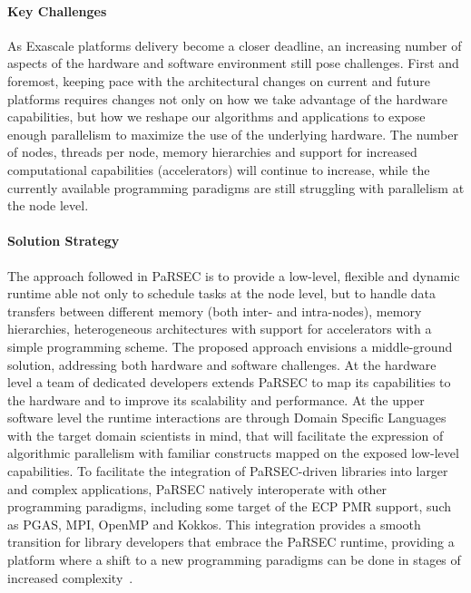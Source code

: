 \paragraph{Key Challenges}

As Exascale platforms delivery become a closer deadline, an increasing number of
aspects of the hardware and software environment still pose challenges. First
and foremost, keeping pace with the architectural changes on current and future
platforms requires changes not only on how we take advantage of the hardware
capabilities, but how we reshape our algorithms and applications to expose
enough parallelism to maximize the use of the underlying hardware. The number of
nodes, threads per node, memory hierarchies and support for increased
computational capabilities (accelerators) will continue to increase, while the
currently available programming paradigms are still struggling with parallelism
at the node level.

\paragraph{Solution Strategy}
The approach followed in PaRSEC is to provide a low-level, flexible and dynamic
runtime able not only to schedule tasks at the node level, but to handle data
transfers between different memory (both inter- and intra-nodes), memory
hierarchies, heterogeneous architectures with support for accelerators with a
simple programming scheme. The proposed approach envisions a middle-ground
solution, addressing both hardware and software challenges. At the hardware
level a team of dedicated developers extends PaRSEC to map its capabilities to
the hardware and to improve its scalability and performance. At the upper
software level the runtime interactions are through Domain Specific Languages
with the target domain scientists in mind, that will facilitate the expression
of algorithmic parallelism with familiar constructs mapped on the exposed
low-level capabilities. To facilitate the integration of PaRSEC-driven libraries
into larger and complex applications, PaRSEC natively interoperate with other
programming paradigms, including some target of the ECP PMR support, such as
PGAS, MPI, OpenMP and Kokkos. This integration provides a smooth transition for
library developers that embrace the PaRSEC runtime, providing a platform where a
shift to a new programming paradigms can be done in stages of increased
complexity~\cite{lorapo-protools,BLR_LU,parsec_pdgemm}.

